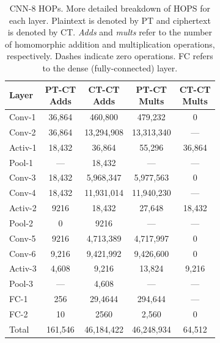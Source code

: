 \documentclass[conference]{IEEEtran}
\begin{document}
\begin{table}[!htbp]
    \centering
    \small
    \begin{tabular}{@{}l|c|c|c|c@{}}
    \toprule
    Layer  & \pbox{20cm}{PT-CT \\ Adds} & \pbox{20cm}{CT-CT \\ Adds} & \pbox{20cm}{PT-CT \\ Mults} & \pbox{20cm}{CT-CT \\ Mults} \\ \midrule
    Conv-1	& 36,864	& 460,800 &	479,232 &	0 \\
    Conv-2 &	36,864 &	13,294,908 &	13,313,340 &	--- \\
    Activ-1 &	18,432 &	36,864 &	55,296 &	36,864 \\
    Pool-1  &	--- &	18,432 &	--- &	--- \\
    Conv-3 &	18,432 &	5,968,347 &	5,977,563 &	0 \\
    Conv-4 & 18,432 &	11,931,014 &	11,940,230 &	--- \\
    Activ-2 &	9216 &	18,432 &	27,648 &	18,432 \\
    Pool-2 & 0 &	9216 &	--- &	--- \\
    Conv-5 &	9216  &	4,713,389 &	4,717,997 &	0 \\
    Conv-6 & 9,216	 & 9,421,992 &	9,426,600 &	0 \\
    Activ-3 &	4,608 &	9,216 &	13,824 &	9,216 \\
    Pool-3 &	--- &	4,608 &	--- &	--- \\
    FC-1 &	256 &	29,4644 &	294,644 &	--- \\
    FC-2 & 10 &	2560 &	2,560 &	0 \\  \midrule
    Total &	161,546 &	46,184,422 &	46,248,934 &	64,512 \\ \bottomrule
    \end{tabular}
    \caption{CNN-8 HOPs. More detailed breakdown of HOPS for each layer. Plaintext is denoted by PT and ciphertext is denoted by CT. \textit{Adds} and \textit{mults} refer to the number of homomorphic addition and multiplication operations, respectively. Dashes indicate zero operations. FC refers to the dense (fully-connected) layer.}
    \label{table:sup_hops_cryptodl2}
\end{table}
\end{document}

